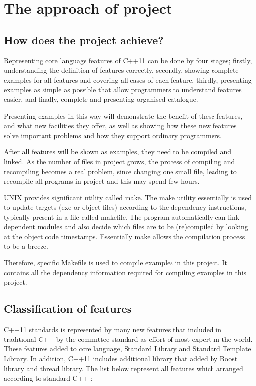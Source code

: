 \documentclass[11pt]{report}
\begin{document}
  
 
\chapter{The approach of project}
\section{How does the project achieve?}
\label{secton: how does the project achieve?}
Representing core language features of C++11 can be done by four stages; firstly, understanding the definition of features correctly, secondly, showing complete examples for all features and covering all cases of each feature, thirdly, presenting examples as simple as possible that allow programmers to understand  features easier, and finally, complete and presenting organised catalogue.

Presenting  examples in this way will  demonstrate the benefit of these features, and what new facilities they offer, as well as showing how these new features solve important problems and how they support ordinary programmers.

After all features will be shown as examples, they need to be compiled and linked. As the number of files in project grows, the process of compiling and recompiling becomes a real problem, since changing one small file, leading to recompile all programs in project and this may spend few hours.

UNIX provides significant utility called make. The make utility essentially is used to update targets (exe or object files) according to the dependency instructions, typically present in a file called makefile. The program automatically can link dependent modules and also decide which files are to be (re)compiled by looking at the object code timestamps. Essentially make allows the compilation process to be a breeze.

Therefore, specific Makefile is used to compile examples in this project. It contains all the dependency information required for compiling examples in this project.



\section{Classification of features}
\label{subsection: overview of features}
C++11 standards is represented by many new features that included in traditional C++ by the committee standard as effort of most expert in the world. These features added  to core language, Standard Library and Standard Template Library. In addition, C++11 includes additional library that added by Boost library and thread library. The list below represent all features which arranged according to standard C++ :-
\end{document}
